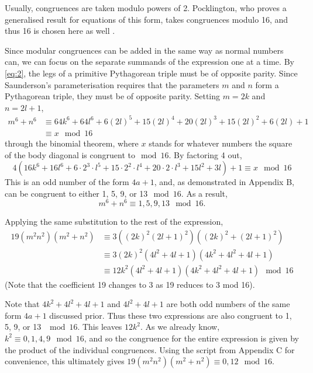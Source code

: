 \documentclass[11pt]{article}
\begin{document}
Usually, congruences are taken modulo powers of 2. Pocklington, who proves a generalised result for equations of this form, takes congruences modulo 16, and thus 16 is chosen here as well \cite{pocklington}. 

Since modular congruences can be added in the same way as normal numbers can, we can focus on the separate summands of the expression one at a time. By \eqref{eq:2}, the legs of a primitive Pythagorean triple must be of opposite parity. Since Saunderson's parameterisation requires that the parameters $m$ and $n$ form a Pythagorean triple, they must be of opposite parity. Setting $m=2k$ and $n=2l+1$, 
\begin{equation*}
\begin{aligned}
m^6+n^6&\equiv{64k^6+64l^6+6(2l)^5+15(2l)^4+20(2l)^3+15(2l)^2+6(2l)+1}\\
&\equiv{x}\mod{16}
\end{aligned}
\end{equation*}
through the binomial theorem, where $x$ stands for whatever numbers the square of the body diagonal is congruent to$\mod{16}$. By factoring 4 out,
$$4(16k^6+16l^6+6\cdot2^3\cdot{l^5}+15\cdot2^2\cdot{l^4}+20\cdot2\cdot{l^3}+15l^2+3l)+1\equiv{x}\mod{16}$$
This is an odd number of the form $4a+1$, and, as demonstrated in Appendix B, can be congruent to either 1, 5, 9, or 13$\mod{16}$.
As a result, 
$$m^6+n^6\equiv{1,5,9,13}\mod{16}.$$

Applying the same substitution to the rest of the expression, 
\begin{equation*}
\begin{aligned}
19(m^2n^2)(m^2+n^2)&\equiv{3((2k)^2(2l+1)^2)((2k)^2+(2l+1)^2)}\\
&\equiv{3(2k)^2(4l^2+4l+1)(4k^2+4l^2+4l+1)}\\
&\equiv{12k^2(4l^2+4l+1)(4k^2+4l^2+4l+1)\mod{16}}
\end{aligned}
\end{equation*}
(Note that the coefficient 19 changes to 3 as 19 reduces to 3 mod 16).

Note that $4k^2+4l^2+4l+1$ and $4l^2+4l+1$ are both odd numbers of the same form $4a+1$ discussed prior. Thus these two expressions are also congruent to 1, 5, 9, or 13 $\mod{16}$. This leaves $12k^2$. As we already know, $k^2\equiv{0,1,4,9}\mod{16}$, and so the congruence for the entire expression is given by the product of the individual congruences. Using the script from Appendix C for convenience, this ultimately gives $19(m^2n^2)(m^2+n^2)\equiv{0, 12}\mod{16}$.
\end{document}
